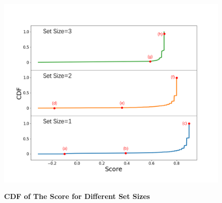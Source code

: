 \documentclass{article}
\begin{document}
\begin{figure}[H]
    \centering
    \includegraphics[scale=0.8]{figs/cdf_score_full.png}
    \label{cdf_score}
    \caption{\textbf{CDF of The Score for Different Set Sizes}}
\end{figure}
\end{document}
